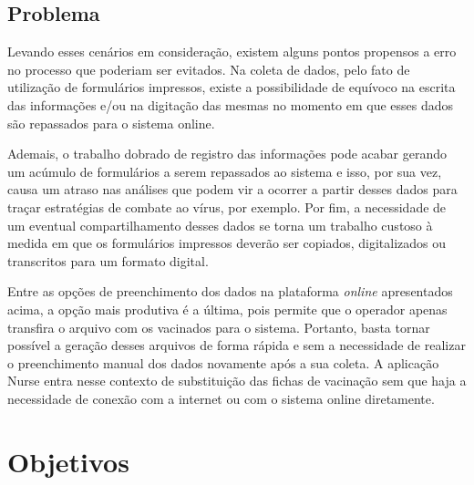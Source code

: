 \subsection{Problema}
\label{cap1:SubSec:Problema}

Levando esses cenários em consideração, existem alguns pontos propensos a erro no processo que poderiam ser evitados. Na coleta de dados, pelo fato de utilização de formulários impressos, existe a possibilidade de equívoco na escrita das informações e/ou na digitação das mesmas no momento em que esses dados são repassados para o sistema online.

Ademais, o trabalho dobrado de registro das informações pode acabar gerando um acúmulo de formulários a serem repassados ao sistema e isso, por sua vez, causa um atraso nas análises que podem vir a ocorrer a partir desses dados para traçar estratégias de combate ao vírus, por exemplo. Por fim, a necessidade de um eventual compartilhamento desses dados se torna um trabalho custoso à medida em que os formulários impressos deverão ser copiados, digitalizados ou transcritos para um formato digital.

Entre as opções de preenchimento dos dados na plataforma \textit{online} apresentados acima, a opção mais produtiva é a última, pois permite que o operador apenas transfira o arquivo com os vacinados para o sistema. Portanto, basta tornar possível a geração desses arquivos de forma rápida e sem a necessidade de realizar o preenchimento manual dos dados novamente após a sua coleta. A aplicação Nurse entra nesse contexto de substituição das fichas de vacinação sem que haja a necessidade de conexão com a internet ou com o sistema online diretamente.






\section{Objetivos}
\label{cap1:Sec:Objetivos}

